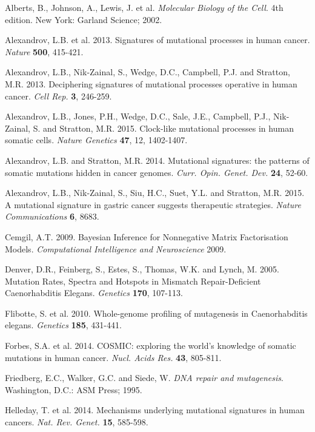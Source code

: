 
\begin{thebibliography}{1}

 Alberts, B., Johnson, A., Lewis, J. et al. \textit{Molecular Biology of the Cell}. 4th edition. New York: Garland Science; 2002.

 Alexandrov, L.B. et al. 2013. Signatures of mutational processes in human cancer. \textit{Nature} \textbf{500}, 415-421.

 Alexandrov, L.B., Nik-Zainal, S., Wedge, D.C., Campbell, P.J. and Stratton, M.R. 2013. Deciphering signatures of mutational processes operative in human cancer. \textit{Cell Rep.} \textbf{3}, 246-259.

 Alexandrov, L.B., Jones, P.H., Wedge, D.C., Sale, J.E., Campbell, P.J., Nik-Zainal, S. and Stratton, M.R. 2015. Clock-like mutational processes in human somatic cells. \textit{Nature Genetics} \textbf{47}, 12, 1402-1407.

 Alexandrov, L.B. and Stratton, M.R. 2014. Mutational signatures: the patterns of somatic mutations hidden in cancer genomes. \textit{Curr. Opin. Genet. Dev.} \textbf{24}, 52-60.

 Alexandrov, L.B., Nik-Zainal, S., Siu, H.C., Suet, Y.L. and Stratton, M.R. 2015. A mutational signature in gastric cancer suggests therapeutic strategies. \textit{Nature Communications} \textbf{6}, 8683.

 Cemgil, A.T. 2009. Bayesian Inference for Nonnegative Matrix Factorisation Models. \textit{Computational Intelligence and Neuroscience} 2009.

 Denver, D.R., Feinberg, S., Estes, S., Thomas, W.K. and Lynch, M. 2005. Mutation Rates, Spectra and Hotspots in Mismatch Repair-Deficient Caenorhabditis Elegans. \textit{Genetics} \textbf{170}, 107-113.

  Flibotte, S. et al. 2010. Whole-genome profiling of mutagenesis in Caenorhabditis elegans. \textit{Genetics} \textbf{185}, 431-441.

 Forbes, S.A. et al. 2014. COSMIC: exploring the world's knowledge of somatic mutations in human cancer. \textit{Nucl. Acids Res.} \textbf{43}, 805-811.

 Friedberg, E.C., Walker, G.C. and Siede, W. \textit{DNA repair and mutagenesis}. Washington, D.C.: ASM Press; 1995.

 Helleday, T. et al. 2014. Mechanisms underlying mutational signatures in human cancers. \textit{Nat. Rev. Genet.} \textbf{15}, 585-598.


\end{thebibliography}
